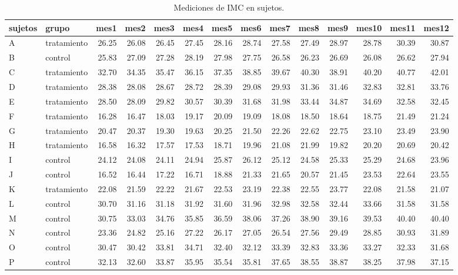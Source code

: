 \documentclass[]{article}
\begin{document}
\begin{table}[H]
\centering
\begingroup\tiny
\begin{tabular}{llrrrrrrrrrrrr}
  \hline
sujetos & grupo & mes1 & mes2 & mes3 & mes4 & mes5 & mes6 & mes7 & mes8 & mes9 & mes10 & mes11 & mes12 \\ 
  \hline
A & tratamiento & 26.25 & 26.08 & 26.45 & 27.45 & 28.16 & 28.74 & 27.58 & 27.49 & 28.97 & 28.78 & 30.39 & 30.87 \\ 
  B & control & 25.83 & 27.09 & 27.28 & 28.19 & 27.98 & 27.75 & 26.58 & 26.23 & 26.69 & 26.08 & 26.62 & 27.94 \\ 
  C & tratamiento & 32.70 & 34.35 & 35.47 & 36.15 & 37.35 & 38.85 & 39.67 & 40.30 & 38.91 & 40.20 & 40.77 & 42.01 \\ 
  D & tratamiento & 28.38 & 28.08 & 28.67 & 28.72 & 28.39 & 29.08 & 29.93 & 31.36 & 31.46 & 32.83 & 32.81 & 33.76 \\ 
  E & tratamiento & 28.50 & 28.09 & 29.82 & 30.57 & 30.39 & 31.68 & 31.98 & 33.44 & 34.87 & 34.69 & 32.58 & 32.45 \\ 
  F & tratamiento & 16.28 & 16.47 & 18.03 & 19.17 & 20.09 & 19.09 & 18.08 & 18.50 & 18.64 & 18.75 & 21.49 & 21.24 \\ 
  G & tratamiento & 20.47 & 20.37 & 19.30 & 19.63 & 20.25 & 21.50 & 22.26 & 22.62 & 22.75 & 23.10 & 23.49 & 23.90 \\ 
  H & tratamiento & 16.58 & 16.32 & 17.57 & 17.53 & 18.71 & 19.96 & 21.08 & 21.99 & 19.82 & 20.20 & 20.69 & 20.42 \\ 
  I & control & 24.12 & 24.08 & 24.11 & 24.94 & 25.87 & 26.12 & 25.12 & 24.58 & 25.33 & 25.29 & 24.68 & 23.96 \\ 
  J & control & 16.52 & 16.44 & 17.22 & 16.71 & 18.88 & 21.33 & 21.65 & 20.57 & 21.45 & 23.53 & 22.64 & 23.55 \\ 
  K & tratamiento & 22.08 & 21.59 & 22.22 & 21.67 & 22.53 & 23.19 & 22.38 & 22.55 & 23.77 & 22.08 & 21.58 & 21.07 \\ 
  L & control & 30.70 & 31.16 & 31.18 & 31.92 & 31.60 & 31.96 & 32.98 & 32.58 & 32.44 & 33.66 & 31.58 & 31.58 \\ 
  M & control & 30.75 & 33.03 & 34.76 & 35.85 & 36.59 & 38.06 & 37.26 & 38.90 & 39.16 & 39.53 & 40.40 & 40.40 \\ 
  N & control & 23.36 & 24.82 & 25.16 & 27.22 & 26.17 & 27.05 & 26.54 & 27.56 & 29.49 & 28.85 & 30.93 & 31.89 \\ 
  O & control & 30.47 & 30.42 & 33.81 & 34.71 & 32.40 & 32.12 & 33.39 & 32.83 & 33.36 & 33.27 & 32.33 & 31.68 \\ 
  P & control & 32.13 & 32.60 & 33.87 & 35.95 & 35.54 & 35.81 & 37.65 & 38.55 & 38.87 & 38.25 & 37.98 & 37.15 \\ 
   \hline
\end{tabular}
\endgroup
\caption{Mediciones de IMC en sujetos.} 
\label{tab:sujetos}
\end{table}
\end{document}
